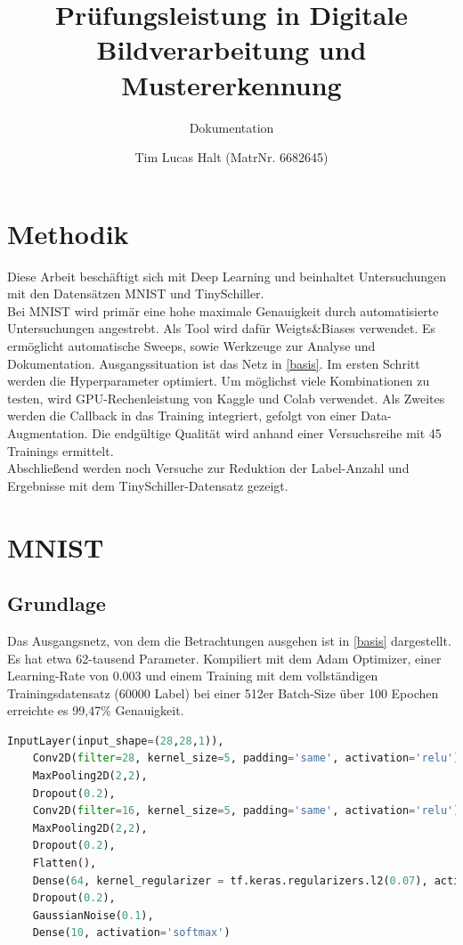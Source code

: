 \documentclass[
fontsize=12pt,					%
paper=a4,						%
twoside=false, 					%
listof=totoc, 					%
bibliography=totoc,				%
titlepage, 						%
headsepline, 					%
DIV=12,							%
BCOR=6mm,						%
cleardoublepage=empty,			%
parskip,							%
ngerman
]{scrartcl}
\title{Prüfungsleistung in \glqq Digitale Bildverarbeitung und Mustererkennung\grqq}
\subtitle{Dokumentation}
\author{Tim Lucas Halt (MatrNr. 6682645)}
\begin{document}
\maketitle

\section{Methodik}

Diese Arbeit beschäftigt sich mit Deep Learning und beinhaltet Untersuchungen mit den Datensätzen MNIST und TinySchiller.\\
Bei MNIST wird primär eine hohe maximale Genauigkeit durch automatisierte Untersuchungen angestrebt. Als Tool wird dafür Weigts\&Biases \autocite{wandb.sweep} verwendet. Es ermöglicht automatische Sweeps, sowie Werkzeuge zur Analyse und Dokumentation. Ausgangssituation ist das Netz in \autoref{basis}. Im ersten Schritt werden die Hyperparameter optimiert. Um möglichst viele Kombinationen zu testen, wird GPU-Rechenleistung von Kaggle und Colab verwendet. Als Zweites werden die Callback in das Training integriert, gefolgt von einer Data-Augmentation. Die endgültige Qualität wird anhand einer Versuchsreihe mit 45 Trainings ermittelt.\\
Abschließend werden noch Versuche zur Reduktion der Label-Anzahl und Ergebnisse mit dem TinySchiller-Datensatz gezeigt.

\section{MNIST}

\subsection{Grundlage}
\label{sec:basis}

Das Ausgangsnetz, von dem die Betrachtungen ausgehen ist in \autoref{basis} dargestellt. Es hat etwa 62-tausend Parameter. Kompiliert mit dem Adam Optimizer, einer Learning-Rate von 0.003 und einem Training mit dem vollständigen Trainingsdatensatz (60000 Label) bei einer 512er Batch-Size über 100 Epochen erreichte es 99,47\% Genauigkeit.

\begin{lstlisting}[language=Python, caption=Grundlagen-Netz, label=basis]
	InputLayer(input_shape=(28,28,1)),
	Conv2D(filter=28, kernel_size=5, padding='same', activation='relu'),
	MaxPooling2D(2,2),
	Dropout(0.2),
	Conv2D(filter=16, kernel_size=5, padding='same', activation='relu'),
	MaxPooling2D(2,2),
	Dropout(0.2),
	Flatten(),
	Dense(64, kernel_regularizer = tf.keras.regularizers.l2(0.07), activation = 'relu'),
	Dropout(0.2),
	GaussianNoise(0.1),
	Dense(10, activation='softmax')
\end{lstlisting}
\end{document}
